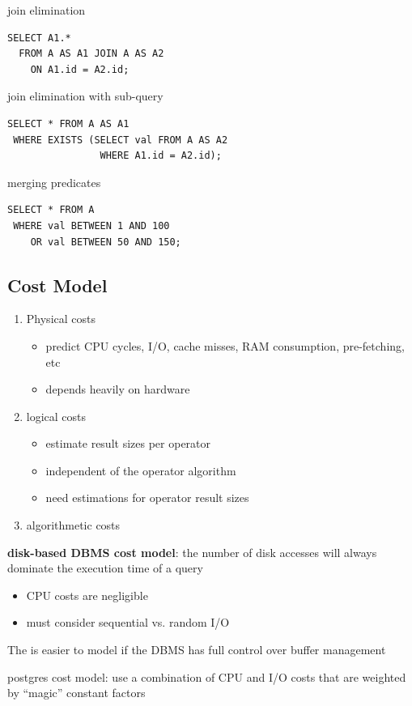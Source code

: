 \documentclass[11pt]{article}
\begin{document}
join elimination
\begin{verbatim}
SELECT A1.*
  FROM A AS A1 JOIN A AS A2
    ON A1.id = A2.id;
\end{verbatim}

join elimination with sub-query
\begin{verbatim}
SELECT * FROM A AS A1
 WHERE EXISTS (SELECT val FROM A AS A2
                WHERE A1.id = A2.id);
\end{verbatim}

merging predicates
\begin{verbatim}
SELECT * FROM A
 WHERE val BETWEEN 1 AND 100
    OR val BETWEEN 50 AND 150;
\end{verbatim}
\subsection{Cost Model}
\label{sec:org2f694d4}
\begin{enumerate}
\item Physical costs
\begin{itemize}
\item predict CPU cycles, I/O, cache misses, RAM consumption, pre-fetching, etc
\item depends heavily on hardware
\end{itemize}
\item logical costs
\begin{itemize}
\item estimate result sizes per operator
\item independent of the operator algorithm
\item need estimations for operator result sizes
\end{itemize}
\item algorithmetic costs
\end{enumerate}

\textbf{disk-based DBMS cost model}: the number of disk accesses will always dominate the execution time
 of a query
\begin{itemize}
\item CPU costs are negligible
\item must consider sequential vs. random I/O
\end{itemize}

The is easier to model if the DBMS has full control over buffer management

postgres cost model: use a combination of CPU and I/O costs that are weighted by ``magic''
constant factors
\end{document}

